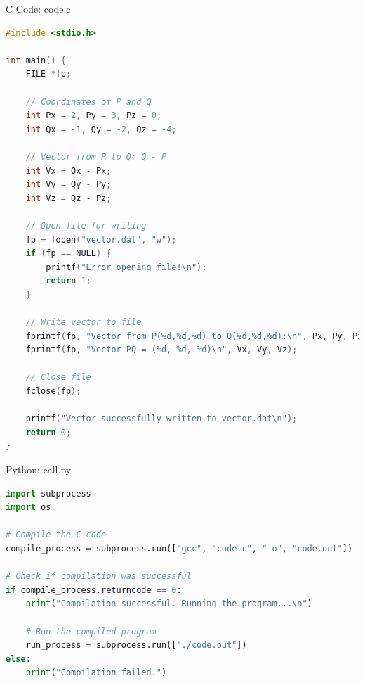 \documentclass{beamer}
\numberwithin{equation}{section}
\theoremstyle{remark}
\begin{document}
\begin{frame}[fragile]{C Code: code.c}
\begin{lstlisting}[language=C]
#include <stdio.h>

int main() {
    FILE *fp;

    // Coordinates of P and Q
    int Px = 2, Py = 3, Pz = 0;
    int Qx = -1, Qy = -2, Qz = -4;

    // Vector from P to Q: Q - P
    int Vx = Qx - Px;
    int Vy = Qy - Py;
    int Vz = Qz - Pz;

    // Open file for writing
    fp = fopen("vector.dat", "w");
    if (fp == NULL) {
        printf("Error opening file!\n");
        return 1;
    }

    // Write vector to file
    fprintf(fp, "Vector from P(%d,%d,%d) to Q(%d,%d,%d):\n", Px, Py, Pz, Qx, Qy, Qz);
    fprintf(fp, "Vector PQ = (%d, %d, %d)\n", Vx, Vy, Vz);

    // Close file
    fclose(fp);

    printf("Vector successfully written to vector.dat\n");
    return 0;
}
\end{lstlisting}
\end{frame}

\begin{frame}[fragile]{Python: call.py}
\begin{lstlisting}[language=Python]
import subprocess
import os

# Compile the C code
compile_process = subprocess.run(["gcc", "code.c", "-o", "code.out"])

# Check if compilation was successful
if compile_process.returncode == 0:
    print("Compilation successful. Running the program...\n")
    
    # Run the compiled program
    run_process = subprocess.run(["./code.out"])
else:
    print("Compilation failed.")
\end{lstlisting}
\end{frame}
\end{document}
